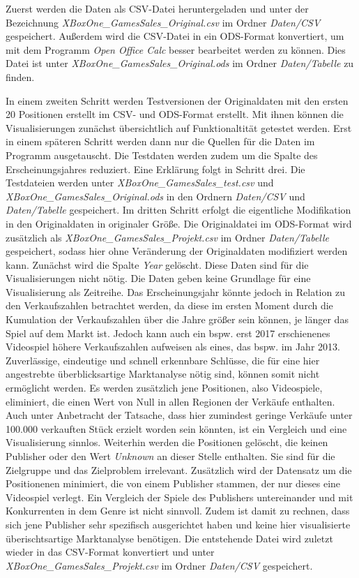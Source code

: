 \documentclass[usegeometry=true]{scrartcl}
\begin{document}
Zuerst werden die Daten als CSV-Datei heruntergeladen und unter der Bezeichnung \textit{XBoxOne\_GamesSales\_Original.csv} im Ordner \textit{Daten/CSV} gespeichert. 
Außerdem wird die CSV-Datei in ein ODS-Format konvertiert, um mit dem Programm \textit{Open Office Calc} besser bearbeitet werden zu können. 
Dies Datei ist unter \textit{XBoxOne\_GamesSales\_Original.ods} im Ordner \textit{Daten/Tabelle} zu finden. 

In einem zweiten Schritt werden Testversionen der Originaldaten mit den ersten 20 Positionen erstellt im CSV- und ODS-Format erstellt. 
Mit ihnen können die Visualisierungen zunächst übersichtlich auf Funktionaltität getestet werden. 
Erst in einem späteren Schritt werden dann nur die Quellen für die Daten im Programm ausgetauscht. 
Die Testdaten werden zudem um die Spalte des Erscheinungsjahres reduziert. Eine Erklärung folgt in Schritt drei.
Die Testdateien werden unter \textit{XBoxOne\_GamesSales\_test.csv} und \textit{XBoxOne\_GamesSales\_Original.ods} in den Ordnern \textit{Daten/CSV} und \textit{Daten/Tabelle} gespeichert.
Im dritten Schritt erfolgt die eigentliche Modifikation in den Originaldaten in originaler Größe. 
Die Originaldatei im ODS-Format wird zusätzlich als \textit{XBoxOne\_GamesSales\_Projekt.csv} im Ordner \textit{Daten/Tabelle} gespeichert, sodass hier ohne Veränderung der Originaldaten modifiziert werden kann.
Zunächst wird die Spalte  \textit{Year} gelöscht. Diese Daten sind für die Visualisierungen nicht nötig. 
Die Daten geben keine Grundlage für eine Visualisierung als Zeitreihe. 
Das Erscheinungsjahr könnte jedoch in Relation zu den Verkaufszahlen betrachtet werden, da diese im ersten Moment durch die Kumulation der Verkaufszahlen über die Jahre größer sein können, je länger das Spiel auf dem Markt ist. 
Jedoch kann auch ein bspw. erst 2017 erschienenes Videospiel höhere Verkaufszahlen aufweisen als eines, das bspw. im Jahr 2013. 
Zuverlässige, eindeutige und schnell erkennbare Schlüsse, die für eine hier angestrebte überblicksartige Marktanalyse nötig sind, können somit nicht ermöglicht werden. 
Es werden zusätzlich jene Positionen, also Videospiele, eliminiert, die einen Wert von Null in allen Regionen der Verkäufe enthalten. 
Auch unter Anbetracht der Tatsache, dass hier zumindest geringe Verkäufe unter 100.000 verkauften Stück erzielt worden sein könnten, ist ein Vergleich und eine Visualisierung sinnlos.
Weiterhin werden die Positionen gelöscht, die keinen Publisher oder den Wert  \textit{Unknown} an dieser Stelle enthalten. Sie sind für die Zielgruppe und das Zielproblem irrelevant.
Zusätzlich wird der Datensatz um die Positionenen minimiert, die von einem Publisher stammen, der nur dieses eine Videospiel verlegt. 
Ein Vergleich der Spiele des Publishers untereinander und mit Konkurrenten in dem Genre ist nicht sinnvoll. 
Zudem ist damit zu rechnen, dass sich jene Publisher sehr spezifisch ausgerichtet haben und keine hier visualisierte überischtsartige Marktanalyse benötigen.
Die entstehende Datei wird zuletzt wieder in das CSV-Format konvertiert und unter \textit{XBoxOne\_GamesSales\_Projekt.csv} im Ordner \textit{Daten/CSV} gespeichert.
\end{document}
